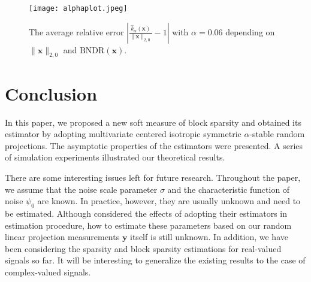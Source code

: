 \documentclass[journal,onecolumn]{IEEEtran}
\begin{document}
\begin{figure}[!t]
\centering
\texttt{[image: alphaplot.jpeg]}
\caption{The average relative error $\left|\frac{\hat{k}_{\alpha}(\mathbf{x})}{\lVert\mathbf{x}\rVert_{2,0}}-1\right|$ with $\alpha=0.06$ depending on $\lVert\mathbf{x}\rVert_{2,0}$ and $\mathrm{BNDR}(\mathbf{x})$.}
\label{fig_7}
\end{figure}



\section{Conclusion}

In this paper, we proposed a new soft measure of block sparsity and obtained its estimator by adopting multivariate centered isotropic symmetric $\alpha$-stable random projections. The asymptotic properties of the estimators were presented. A series of simulation experiments illustrated our theoretical results.

There are some interesting issues left for future research. Throughout the paper, we assume that the noise scale parameter $\sigma$ and the characteristic function of noise $\psi_0$ are known. In practice, however, they are usually unknown and need to be estimated. Although \cite{l2} considered the effects of adopting their estimators in estimation procedure, how to estimate these parameters based on our random linear projection measurements $\mathbf{y}$ itself is still unknown. In addition, we have been considering the sparsity and block sparsity estimations for real-valued signals so far. It will be interesting to generalize the existing results to the case of complex-valued signals.





\end{document}
